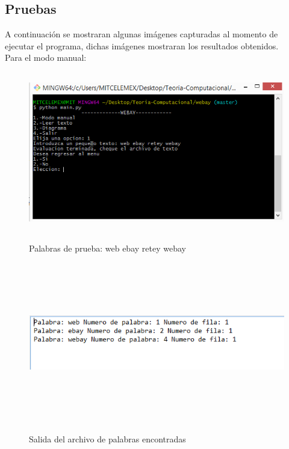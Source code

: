 \newpage

\subsection{Pruebas}
A continuaci\'on se mostraran algunas im\'agenes capturadas al momento de ejecutar el programa, dichas im\'agenes mostraran los resultados obtenidos.\\
\vspace{1.0cm}
Para el modo manual:\\
\begin{figure}[H]
\includegraphics[width=\textwidth, height=7cm]{ModoManualWebay.png}
\label{fig:manual_webay}
\caption{Palabras de prueba: web ebay retey webay}
\end{figure}

\begin{figure}[H]
\includegraphics[width=\textwidth, height=7cm]{ArchivoWebay.png}
\label{fig:manualtexto_alfabeto}
\caption{Salida del archivo de palabras encontradas}
\end{figure}

